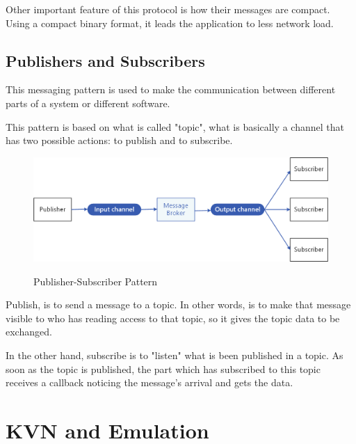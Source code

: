 \documentclass[../monografia.tex]{subfiles}
\begin{document}
Other important feature of this protocol is how their messages are compact. Using a compact binary format, it leads the application to less network load.

\section{Publishers and Subscribers}
This messaging pattern \cite{publisher_subscriber} is used to make the communication between different parts of a system or different software.

This pattern is based on what is called "topic", what is basically a channel that has two possible actions: to publish and to subscribe.

\begin{figure}[h]
\centering
    \caption{Publisher-Subscriber Pattern}
    \centering %
    \includegraphics[width=14cm]{publish-subscribe.png}
    \label{fig: publisher subscriber pattern}
\end{figure}

Publish, is to send a message to a topic. In other words, is to make that message visible to who has reading access to that topic, so it gives the topic data to be exchanged.

In the other hand, subscribe is to "listen" what is been published in a topic. As soon as the topic is published, the part which has subscribed to this topic receives a callback noticing the message's arrival and gets the data.

\chapter{KVN and Emulation}
\end{document}
